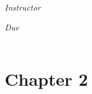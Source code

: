 \documentclass[12pt, oneside]{book}
\begin{document}
\begin{titlepage}
\begin{center}
\begin{large}
            \textit{Instructor} \\[1ex] %
            \professor

            \vspace*{1\baselineskip}

            \textit{Due}\\[1ex]
            {\scshape  \finaldate} \\[0.3\baselineskip] %

            \thispagestyle{empty}

        \end{large}
    \end{center}
\end{titlepage}



\section*{Chapter 2}
\end{document}
